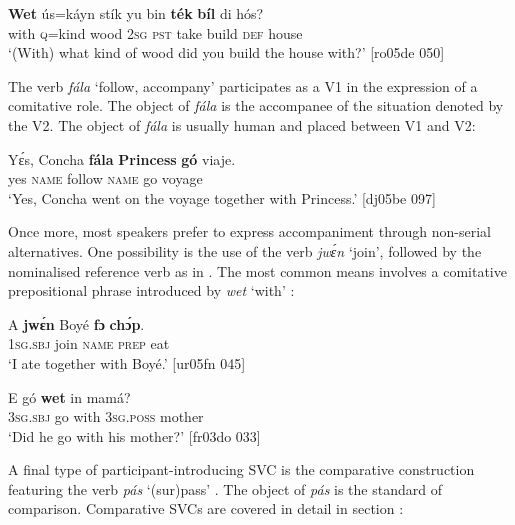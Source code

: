 \ea%
    \label{ex:key:1572}
    \gll \textbf{Wet}    ús=káyn  stík    yu  bin  \textbf{ték}    \textbf{bíl}   di  hós?\\
with    \textsc{q}=kind  wood  \textsc{2sg}  \textsc{pst}  take    build  \textsc{def}  house\\

\glt ‘(With) what kind of wood did you build the house with?’ [ro05de 050]
\z

The verb \textit{fála} ‘follow, accompany’ participates as a V1 in the expression of a comitative role. The object of \textit{fála} is the accompanee of the situation denoted by the V2. The object of \textit{fála} is usually human and placed between V1 and V2:


\ea%
    \label{ex:key:1573}
    \gll Yɛ́s,    Concha  \textbf{fála}    \textbf{Princess}    \textbf{gó}  viaje.\\
yes    \textsc{name}  follow  \textsc{name}    go  voyage\\

\glt ‘Yes, Concha went on the voyage together with Princess.’ [dj05be 097]
\z

Once more, most speakers prefer to express accompaniment through non-serial alternatives. One possibility is the use of the verb \textit{jwɛ́n} ‘join’, followed by the nominalised reference verb{\fff} as in . The most common means involves a comitative prepositional phrase introduced by \textit{wet} ‘with’ :


\ea%
    \label{ex:key:1574}
    \gll A    \textbf{jwɛ́n}  Boyé  \textbf{fɔ}  \textbf{chɔ́p}.\\
\textsc{1sg.sbj}  join    \textsc{name}  \textsc{prep}  eat\\

\glt ‘I ate together with Boyé.’ [ur05fn 045]
\z


\ea%
    \label{ex:key:1575}
    \gll E    gó  \textbf{wet}    in    mamá?\\
\textsc{3sg.sbj}  go  with    \textsc{3sg.poss}  mother\\

\glt ‘Did he go with his mother?’ [fr03do 033]
\z

A final type of participant-introducing SVC is the comparative construction featuring the verb \textit{pás} ‘(sur)pass’ . The object of \textit{pás} is the standard of comparison. Comparative SVCs are covered in detail in section :


